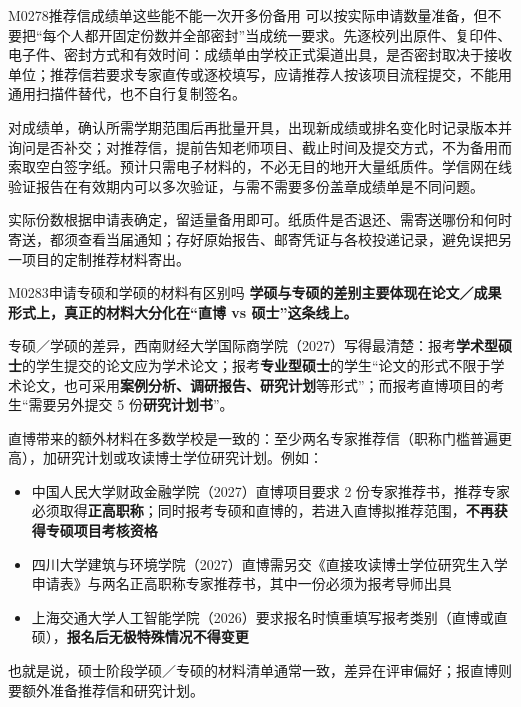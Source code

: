 \begin{qa}{M0278}{推荐信成绩单这些能不能一次开多份备用}
可以按实际申请数量准备，但不要把“每个人都开固定份数并全部密封”当成统一要求。先逐校列出原件、复印件、电子件、密封方式和有效时间：成绩单由学校正式渠道出具，是否密封取决于接收单位；推荐信若要求专家直传或逐校填写，应请推荐人按该项目流程提交，不能用通用扫描件替代，也不自行复制签名。

对成绩单，确认所需学期范围后再批量开具，出现新成绩或排名变化时记录版本并询问是否补交；对推荐信，提前告知老师项目、截止时间及提交方式，不为备用而索取空白签字纸。预计只需电子材料的，不必无目的地开大量纸质件。学信网在线验证报告在有效期内可以多次验证，与需不需要多份盖章成绩单是不同问题。

实际份数根据申请表确定，留适量备用即可。纸质件是否退还、需寄送哪份和何时寄送，都须查看当届通知；存好原始报告、邮寄凭证与各校投递记录，避免误把另一项目的定制推荐材料寄出。
\end{qa}

\begin{qa}{M0283}{申请专硕和学硕的材料有区别吗}
\textbf{学硕与专硕的差别主要体现在论文／成果形式上，真正的材料大分化在“直博 vs 硕士”这条线上。}

专硕／学硕的差异，西南财经大学国际商学院（2027）写得最清楚：报考\textbf{学术型硕士}的学生提交的论文应为学术论文；报考\textbf{专业型硕士}的学生“论文的形式不限于学术论文，也可采用\textbf{案例分析、调研报告、研究计划}等形式”；而报考直博项目的考生“需要另外提交 5 份\textbf{研究计划书}”。

直博带来的额外材料在多数学校是一致的：至少两名专家推荐信（职称门槛普遍更高），加研究计划或攻读博士学位研究计划。例如：

\begin{itemize}
  \item 中国人民大学财政金融学院（2027）直博项目要求 2 份专家推荐书，推荐专家必须取得\textbf{正高职称}；同时报考专硕和直博的，若进入直博拟推荐范围，\textbf{不再获得专硕项目考核资格}
  \item 四川大学建筑与环境学院（2027）直博需另交《直接攻读博士学位研究生入学申请表》与两名正高职称专家推荐书，其中一份必须为报考导师出具
  \item 上海交通大学人工智能学院（2026）要求报名时慎重填写报考类别（直博或直硕），\textbf{报名后无极特殊情况不得变更}
\end{itemize}

也就是说，硕士阶段学硕／专硕的材料清单通常一致，差异在评审偏好；报直博则要额外准备推荐信和研究计划。
\end{qa}


